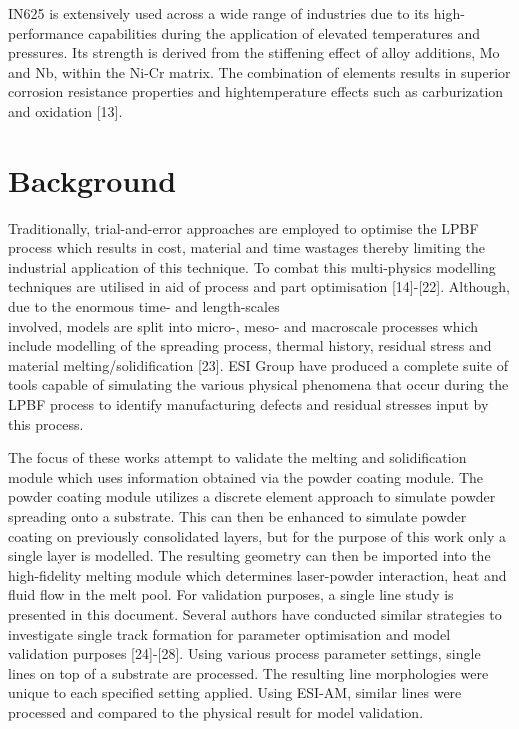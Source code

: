 \documentclass[10pt]{article}
\begin{document}
IN625 is extensively used across a wide range of industries due to its high-performance capabilities during the application of elevated temperatures and pressures. Its strength is derived from the stiffening effect of alloy additions, Mo and Nb, within the Ni-Cr matrix. The combination of elements results in superior corrosion resistance properties and hightemperature effects such as carburization and oxidation [13].

\section*{Background}
Traditionally, trial-and-error approaches are employed to optimise the LPBF process which results in cost, material and time wastages thereby limiting the industrial application of this technique. To combat this multi-physics modelling techniques are utilised in aid of process and part optimisation [14]-[22]. Although, due to the enormous time- and length-scales\\
involved, models are split into micro-, meso- and macroscale processes which include modelling of the spreading process, thermal history, residual stress and material melting/solidification [23]. ESI Group have produced a complete suite of tools capable of simulating the various physical phenomena that occur during the LPBF process to identify manufacturing defects and residual stresses input by this process.

The focus of these works attempt to validate the melting and solidification module which uses information obtained via the powder coating module. The powder coating module utilizes a discrete element approach to simulate powder spreading onto a substrate. This can then be enhanced to simulate powder coating on previously consolidated layers, but for the purpose of this work only a single layer is modelled. The resulting geometry can then be imported into the high-fidelity melting module which determines laser-powder interaction, heat and fluid flow in the melt pool. For validation purposes, a single line study is presented in this document. Several authors have conducted similar strategies to investigate single track formation for parameter optimisation and model validation purposes [24]-[28]. Using various process parameter settings, single lines on top of a substrate are processed. The resulting line morphologies were unique to each specified setting applied. Using ESI-AM, similar lines were processed and compared to the physical result for model validation.
\end{document}
